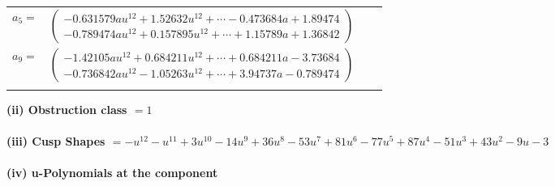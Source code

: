 \documentclass[1p]{elsarticle_modified}
\theoremstyle{definition}
\begin{document}
\begin{tabular}{m{7pt} m{180pt} m{7pt} m{180pt} }
\flushright $a_{5}=$&$\begin{pmatrix}-0.631579 a u^{12}+1.52632 u^{12}+\cdots-0.473684 a+1.89474\\-0.789474 a u^{12}+0.157895 u^{12}+\cdots+1.15789 a+1.36842\end{pmatrix}$ \\
\flushright $a_{9}=$&$\begin{pmatrix}-1.42105 a u^{12}+0.684211 u^{12}+\cdots+0.684211 a-3.73684\\-0.736842 a u^{12}-1.05263 u^{12}+\cdots+3.94737 a-0.789474\end{pmatrix}$\\&\end{tabular}
\flushleft \textbf{(ii) Obstruction class $= 1$}\\~\\
\flushleft \textbf{(iii) Cusp Shapes $= - u^{12}- u^{11}+3 u^{10}-14 u^9+36 u^8-53 u^7+81 u^6-77 u^5+87 u^4-51 u^3+43 u^2-9 u-3$}\\~\\
\newpage\renewcommand{\arraystretch}{1}
\flushleft \textbf{(iv) u-Polynomials at the component}\newline \\
\end{document}
